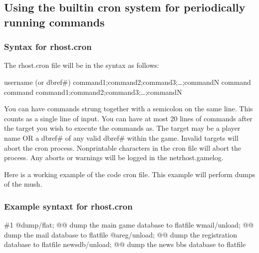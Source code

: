 \documentclass[letterpaper,10pt,english]{sphinxmanual}
\begin{document}
\subsection{Using the built\sphinxhyphen{}in cron system for periodically running commands}
\label{\detokenize{maintenance:using-the-built-in-cron-system-for-periodically-running-commands}}

\subsubsection{Syntax for rhost.cron}
\label{\detokenize{maintenance:syntax-for-rhost-cron}}
\sphinxAtStartPar
The rhost.cron file will be in the syntax as follows:

\sphinxAtStartPar
username (or dbref\#)
command1;command2;command3;…;commandN
command
command
command1;command2;command3;…;commandN

\sphinxAtStartPar
You can have commands strung together with a semicolon
on the same line.  This counts as a single line of input.
You can have at most 20 lines of commands after the target
you wish to execute the commands as.  The target may
be a player name OR a dbref\# of any valid dbref\# within
the game.  Invalid targets will abort the cron process.
Non\sphinxhyphen{}printable characters in the cron file will abort
the process.  Any aborts or warnings will be logged
in the netrhost.gamelog.

\sphinxAtStartPar
Here is a working example of the code cron file.
This example will perform dumps of the mush.


\subsubsection{Example syntaxt for rhost.cron}
\label{\detokenize{maintenance:example-syntaxt-for-rhost-cron}}
\sphinxAtStartPar
\#1
@dump/flat; @@ dump the main game database to flatfile
wmail/unload; @@ dump the mail database to flatfile
@areg/unload; @@ dump the registration database to flatfile
newsdb/unload; @@ dump the news bbs database to flatfile
\end{document}
